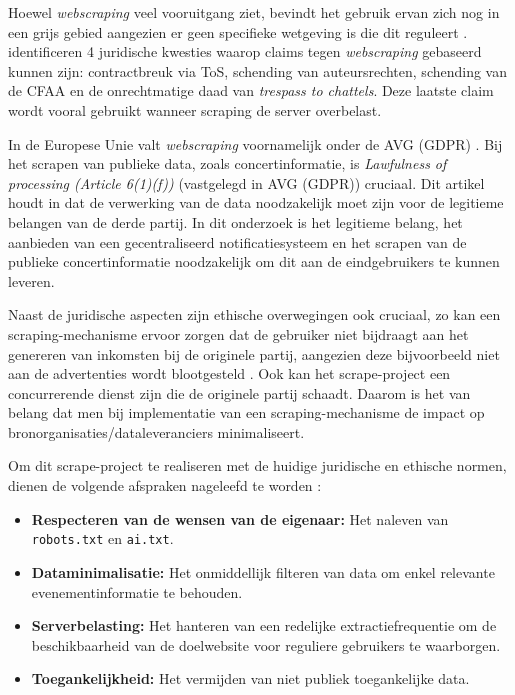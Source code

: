 Hoewel \textit{webscraping} veel vooruitgang ziet, bevindt het gebruik ervan zich nog in een grijs gebied aangezien er geen specifieke wetgeving is die dit reguleert \autocite{Krotov2018}. \textcite{Krotov2018} identificeren 4 juridische kwesties waarop claims tegen \textit{webscraping} gebaseerd kunnen zijn: contractbreuk via \gls{ToS}, schending van auteursrechten, schending van de \gls{CFAA} en de onrechtmatige daad van \textit{trespass to chattels}. Deze laatste claim wordt vooral gebruikt wanneer scraping de server overbelast.

In de Europese Unie valt \textit{webscraping} voornamelijk onder de \gls{AVG} (\gls{GDPR}) \autocite{Bereczki2024}. Bij het scrapen van publieke data, zoals concertinformatie, is \textit{Lawfulness of processing (Article 6(1)(f))} (vastgelegd in \gls{AVG} (\gls{GDPR})) cruciaal. Dit artikel houdt in dat de verwerking van de data noodzakelijk moet zijn voor de legitieme belangen van de derde partij. In dit onderzoek is het legitieme belang, het aanbieden van een gecentraliseerd notificatiesysteem en het scrapen van de publieke concertinformatie noodzakelijk om dit aan de eindgebruikers te kunnen leveren.

Naast de juridische aspecten zijn ethische overwegingen ook cruciaal, zo kan een scraping-mechanisme ervoor zorgen dat de gebruiker niet bijdraagt aan het genereren van inkomsten bij de originele partij, aangezien deze bijvoorbeeld niet aan de advertenties wordt blootgesteld \autocite{Krotov2018}. Ook kan het scrape-project een concurrerende dienst zijn die de originele partij schaadt. Daarom is het van belang dat men bij implementatie van een scraping-mechanisme de impact op bronorganisaties/dataleveranciers minimaliseert.

Om dit scrape-project te realiseren met de huidige juridische en ethische normen, dienen de volgende afspraken nageleefd te worden \autocite{Bereczki2024,Lin2021}:

\begin{itemize}
\item \textbf{Respecteren van de wensen van de eigenaar:} Het naleven van \texttt{robots.txt} en \texttt{ai.txt}.
\item \textbf{Dataminimalisatie:} Het onmiddellijk filteren van data om enkel relevante evenementinformatie te behouden.
\item \textbf{Serverbelasting:} Het hanteren van een redelijke extractiefrequentie om de beschikbaarheid van de doelwebsite voor reguliere gebruikers te waarborgen.
\item \textbf{Toegankelijkheid:} Het vermijden van niet publiek toegankelijke data.
\end{itemize}

